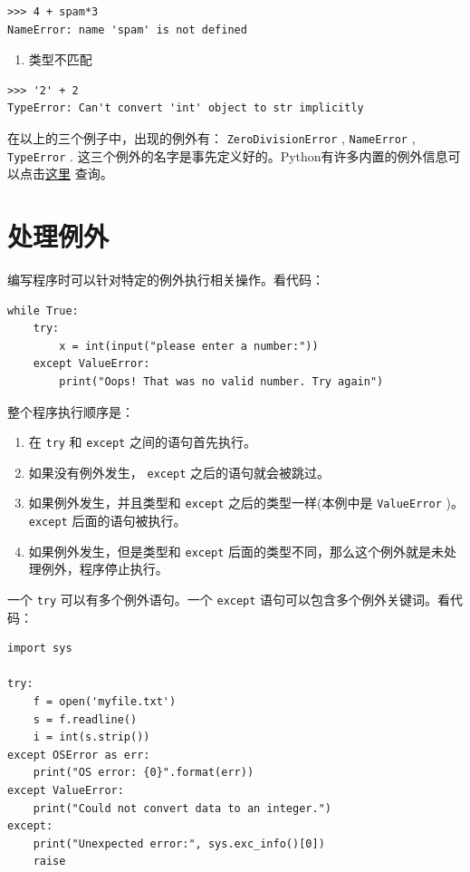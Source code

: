 \documentclass[10pt,a4paper,UTF8]{article}
\begin{document}
\begin{verbatim}
>>> 4 + spam*3
NameError: name 'spam' is not defined
\end{verbatim}

\begin{enumerate}
\item 类型不匹配
\end{enumerate}

\begin{verbatim}
>>> '2' + 2
TypeError: Can't convert 'int' object to str implicitly
\end{verbatim}
在以上的三个例子中，出现的例外有： \texttt{ZeroDivisionError} ,  \texttt{NameError} , \texttt{TypeError} . 这三个例外的名字是事先定义好的。Python有许多内置的例外信息可以点击\href{https://docs.python.org/3.5/library/exceptions.html\#bltin-exceptions}{这里} 查询。

\section{处理例外}
\label{sec:orgb3b9161}


编写程序时可以针对特定的例外执行相关操作。看代码：
\lstset{language=Python,label= ,caption= ,captionpos=b,numbers=none}
\begin{lstlisting}
while True:
    try:
        x = int(input("please enter a number:"))
    except ValueError:
        print("Oops! That was no valid number. Try again")
\end{lstlisting}

整个程序执行顺序是：
\begin{enumerate}
\item 在 \texttt{try} 和 \texttt{except} 之间的语句首先执行。
\item 如果没有例外发生， \texttt{except} 之后的语句就会被跳过。
\item 如果例外发生，并且类型和 \texttt{except} 之后的类型一样(本例中是 \texttt{ValueError} )。 \texttt{except} 后面的语句被执行。
\item 如果例外发生，但是类型和 \texttt{except} 后面的类型不同，那么这个例外就是未处理例外，程序停止执行。
\end{enumerate}

一个 \texttt{try} 可以有多个例外语句。一个 \texttt{except} 语句可以包含多个例外关键词。看代码：
\lstset{language=Python,label= ,caption= ,captionpos=b,numbers=none}
\begin{lstlisting}
import sys

try:
    f = open('myfile.txt')
    s = f.readline()
    i = int(s.strip())
except OSError as err:
    print("OS error: {0}".format(err))
except ValueError:
    print("Could not convert data to an integer.")
except:
    print("Unexpected error:", sys.exc_info()[0])
    raise
\end{lstlisting}
\end{document}
